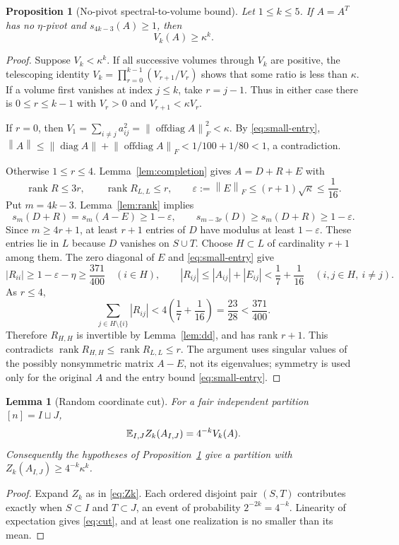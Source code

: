 \documentclass[11pt]{article}
\numberwithin{equation}{section}
\newtheorem{lemma}[theorem]{Lemma}
\newtheorem{proposition}[theorem]{Proposition}
\theoremstyle{definition}\newtheorem{definition}[theorem]{Definition}
\theoremstyle{remark}\newtheorem{remark}[theorem]{Remark}
\newcommand{\1}{\mathbf 1}\newcommand{\diag}{\operatorname{diag}}
\newcommand{\rank}{\operatorname{rank}}\newcommand{\tr}{\operatorname{tr}}
\newcommand{\off}{\operatorname{offdiag}}\newcommand{\supp}{\operatorname{supp}}
\newcommand{\norm}[1]{\left\lVert#1\right\rVert}\newcommand{\abs}[1]{\left|#1\right|}
\begin{document}
\begin{proposition}[No-pivot spectral-to-volume bound]\label{prop:volume}
Let $1\le k\le5$. If $A=A^T$ has no $\eta$-pivot and $s_{4k-3}(A)\ge1$, then
\begin{equation}\label{eq:volume-lower}
 V_k(A)\ge\kappa^k.
\end{equation}
\end{proposition}
\begin{proof}
Suppose $V_k<\kappa^k$. If all successive volumes through $V_k$ are positive, the telescoping identity
$V_k=\prod_{r=0}^{k-1}(V_{r+1}/V_r)$ shows that some ratio is less than $\kappa$. If a volume first vanishes at index $j\le k$, take $r=j-1$. Thus in either case there is $0\le r\le k-1$ with $V_r>0$ and $V_{r+1}<\kappa V_r$.

If $r=0$, then
$V_1=\sum_{i\ne j}a_{ij}^2=\norm{\off A}_F^2<\kappa$.
By \eqref{eq:small-entry}, $\norm A\le\norm{\diag A}+\norm{\off A}_F<1/100+1/80<1$, a contradiction.

Otherwise $1\le r\le4$. Lemma~\ref{lem:completion} gives $A=D+R+E$ with
\[
 \rank R\le3r,\qquad \rank R_{L,L}\le r,\qquad
 \varepsilon:=\norm E_F\le(r+1)\sqrt\kappa\le\frac1{16}.
\]
Put $m=4k-3$. Lemma~\ref{lem:rank} implies
\[
 s_m(D+R)=s_m(A-E)\ge1-\varepsilon,
 \qquad s_{m-3r}(D)\ge s_m(D+R)\ge1-\varepsilon.
\]
Since $m\ge4r+1$, at least $r+1$ entries of $D$ have modulus at least $1-\varepsilon$. These entries lie in $L$ because $D$ vanishes on $S\cup T$. Choose $H\subset L$ of cardinality $r+1$ among them. The zero diagonal of $E$ and \eqref{eq:small-entry} give
\[
 |R_{ii}|\ge1-\varepsilon-\eta\ge\frac{371}{400}
 \quad(i\in H),\qquad
 |R_{ij}|\le|A_{ij}|+|E_{ij}|<\frac17+\frac1{16}
 \quad(i,j\in H,\ i\ne j).
\]
As $r\le4$,
\[
 \sum_{j\in H\setminus\{i\}}|R_{ij}|
 <4\left(\frac17+\frac1{16}\right)=\frac{23}{28}<\frac{371}{400}.
\]
Therefore $R_{H,H}$ is invertible by Lemma~\ref{lem:dd}, and has rank $r+1$. This contradicts $\rank R_{H,H}\le\rank R_{L,L}\le r$. The argument uses singular values of the possibly nonsymmetric matrix $A-E$, not its eigenvalues; symmetry is used only for the original $A$ and the entry bound \eqref{eq:small-entry}.
\end{proof}

\begin{lemma}[Random coordinate cut]\label{lem:cut}
For a fair independent partition $[n]=I\sqcup J$,
\begin{equation}\label{eq:cut}
 \mathbb E_{I,J}Z_k(A_{I,J})=4^{-k}V_k(A).
\end{equation}
Consequently the hypotheses of Proposition~\ref{prop:volume} give a partition with $Z_k(A_{I,J})\ge4^{-k}\kappa^k$.
\end{lemma}
\begin{proof}
Expand $Z_k$ as in \eqref{eq:Zk}. Each ordered disjoint pair $(S,T)$ contributes exactly when $S\subset I$ and $T\subset J$, an event of probability $2^{-2k}=4^{-k}$. Linearity of expectation gives \eqref{eq:cut}, and at least one realization is no smaller than its mean.
\end{proof}
\end{document}
